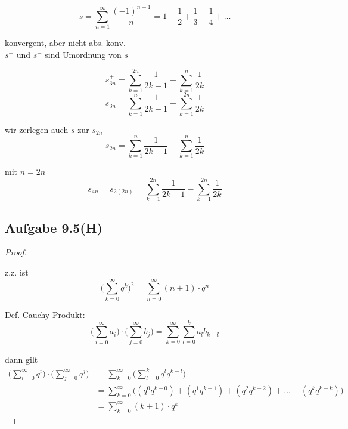 \begin{equation*}
s=\sum_{n=1}^{\infty}\frac{(-1)^{n-1}}{n}=1-\frac{1}{2}+\frac{1}{3}-\frac{1}{4}+\ldots
\end{equation*}

konvergent, aber nicht abs. konv.\\

$s^+$ und $s^-$ sind Umordnung  von $s$

\begin{equation*}
s^+_{3n}=\sum_{k=1}^{2n}\frac{1}{2k-1}-\sum_{k=1}^{n}\frac{1}{2k}
\end{equation*}
\begin{equation*}
s^-_{3n}=\sum_{k=1}^{n}\frac{1}{2k-1}-\sum_{k=1}^{2n}\frac{1}{2k}
\end{equation*}

wir zerlegen auch $s$ zur $s_{2n}$
\begin{equation*}
s_{2n}=\sum_{k=1}^{n}\frac{1}{2k-1}-\sum_{k=1}^{n}\frac{1}{2k}
\end{equation*}

mit $n=2n$
\begin{equation*}
s_{4n}=s_{2(2n)}=\sum_{k=1}^{2n}\frac{1}{2k-1}-\sum_{k=1}^{2n}\frac{1}{2k}
\end{equation*}

\newpage

\subsection{Aufgabe 9.5(H)}
\begin{proof}
$ $\newline

z.z. ist
\begin{equation*}
\Bigg(\sum_{k=0}^\infty q^k\Bigg)^2=\sum_{n=0}^\infty(n+1)\cdot q^n
\end{equation*}

Def. Cauchy-Produkt:
\begin{equation*}
\Bigg(\sum_{i=0}^\infty a_i\Bigg)\cdot\Bigg(\sum_{j=0}^\infty b_j\Bigg)=\sum_{k=0}^\infty\sum_{l=0}^k a_lb_{k-l}
\end{equation*}

dann gilt
\begin{align*}
\Bigg(\sum_{i=0}^\infty q^i\Bigg)\cdot\Bigg(\sum_{j=0}^\infty q^j\Bigg)
&=\sum_{k=0}^\infty\Bigg(\sum_{l=0}^k q^lq^{k-l}\Bigg)\\
&=\sum_{k=0}^\infty\Bigg((q^0q^{k-0})+(q^1q^{k-1})+(q^2q^{k-2})+\ldots+(q^kq^{k-k})\Bigg)\\
&=\sum_{k=0}^\infty(k+1)\cdot q^k
\end{align*}
\end{proof}

